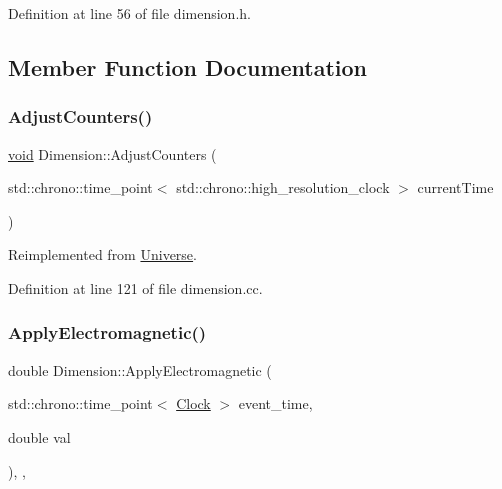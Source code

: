 Definition at line 56 of file dimension.\+h.



\subsection{Member Function Documentation}
\mbox{\label{class_dimension_a31e28c2777888449fad32843f6dd15ed}} 
\subsubsection{\texorpdfstring{Adjust\+Counters()}{AdjustCounters()}}
{\footnotesize\ttfamily \mbox{\hyperlink{glad_8h_a950fc91edb4504f62f1c577bf4727c29}{void}} Dimension\+::\+Adjust\+Counters (\begin{DoxyParamCaption}\item[{std\+::chrono\+::time\+\_\+point$<$ std\+::chrono\+::high\+\_\+resolution\+\_\+clock $>$}]{current\+Time }\end{DoxyParamCaption})\hspace{0.3cm}{\ttfamily [virtual]}}



Reimplemented from \mbox{\hyperlink{class_universe_a15aa20218286fd11ecb9b792dfb63be3}{Universe}}.



Definition at line 121 of file dimension.\+cc.

\mbox{\label{class_dimension_a65bcd3c09792cf53b1f614eff49cf111}} 
\subsubsection{\texorpdfstring{Apply\+Electromagnetic()}{ApplyElectromagnetic()}}
{\footnotesize\ttfamily double Dimension\+::\+Apply\+Electromagnetic (\begin{DoxyParamCaption}\item[{std\+::chrono\+::time\+\_\+point$<$ \mbox{\hyperlink{universe_8h_a0ef8d951d1ca5ab3cfaf7ab4c7a6fd80}{Clock}} $>$}]{event\+\_\+time,  }\item[{double}]{val }\end{DoxyParamCaption})\hspace{0.3cm}{\ttfamily [inline]}, {\ttfamily [final]}, {\ttfamily [virtual]}}



